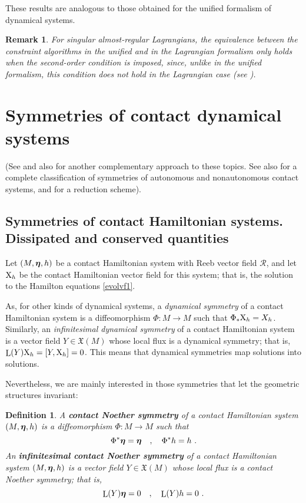 \documentclass[12pt]{report}
\newtheorem{definition}[teor]{Definition}
\newtheorem{remark}[teor]{Remark}
\def\vf{\mathfrak X}
\def\bmeta{\mbox{\boldmath $\eta$}}
\def\X{{\rm X}}
\def\Lie{\mathop{\rm L}\nolimits}
\newcommand{\Reeb}{\mathcal{R}}
\begin{document}
These results are analogous to those obtained for the unified
formalism of  dynamical systems.

\begin{remark}{\rm
For singular almost-regular Lagrangians, the equivalence between the constraint algorithms 
in the unified and in the Lagrangian formalism
only holds when the second-order condition is imposed,
since, unlike in the unified formalism, this condition does not hold in the Lagrangian case (see \cite{MR-92,SR-83}).
}\end{remark}


\section{Symmetries of contact dynamical systems}
\label{sims}


(See \cite{GGMRR-2019b} and also \cite{DeLeon2019b} for another complementary approach to these topics. See also \cite{GLR-2023} for a complete classification of symmetries of autonomous and nonautonomous contact systems, and \cite{ACLMMP-23} for a reduction scheme).


\subsection{Symmetries of contact Hamiltonian systems. Dissipated and conserved quantities}


Let $(M,\bmeta,h)$ be a contact Hamiltonian system with Reeb vector field $\Reeb$,
and let $\X_h$ be the contact Hamiltonian vector field for this system;
that is, the solution to the Hamilton equations \eqref{evolvf1}.

As, for other kinds of dynamical systems,
a \textsl{dynamical symmetry} of a contact Hamiltonian system  is a diffeomorphism 
$\Phi\colon M\longrightarrow M$ such that $\Phi_*\X_h=X_h$.
Similarly, an \textsl{infinitesimal dynamical symmetry} of a contact Hamiltonian system  is a vector field 
$Y\in\vf(M)$ whose local flux is a dynamical symmetry; that is,
$\Lie(Y)\X_h=[Y,\X_h]=0$.
This means that dynamical symmetries map solutions into solutions.

Nevertheless, we are mainly interested in those symmetries that let
the geometric structures invariant:

\begin{definition}
\label{defsym}
A \textbf{contact Noether symmetry} of a contact Hamiltonian system $(M,\bmeta,h)$ is a diffeomorphism 
$\Phi\colon M\rightarrow M$ such that
$$
\Phi^*\bmeta=\bmeta
\quad ,\quad 
\Phi^*h=h \ .
$$
An \textbf{infinitesimal contact Noether symmetry} of a contact Hamiltonian system $(M,\bmeta,h)$ is a vector field 
$Y\in \vf(M)$ whose local flux is a contact Noether symmetry; that is,
$$
\Lie(Y)\bmeta=0
\quad ,\quad 
\Lie(Y)h=0 \ .
$$
\end{definition}
\end{document}
